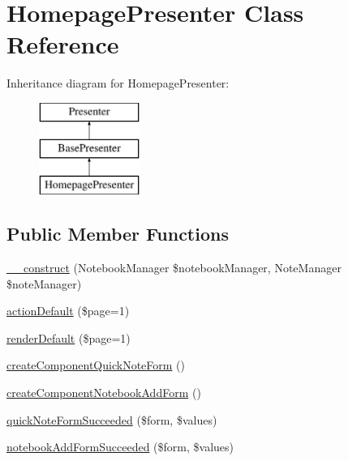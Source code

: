 \hypertarget{class_app_1_1_presenters_1_1_homepage_presenter}{}\section{Homepage\+Presenter Class Reference}
\label{class_app_1_1_presenters_1_1_homepage_presenter}
Inheritance diagram for Homepage\+Presenter\+:\begin{figure}[H]
\begin{center}
\leavevmode
\includegraphics[height=3.000000cm]{class_app_1_1_presenters_1_1_homepage_presenter}
\end{center}
\end{figure}
\subsection*{Public Member Functions}
\begin{DoxyCompactItemize}
\item 
\mbox{\hyperlink{class_app_1_1_presenters_1_1_homepage_presenter_abf10af0e00d40379ce44c79183832689}{\+\_\+\+\_\+construct}} (Notebook\+Manager \$notebook\+Manager, Note\+Manager \$note\+Manager)
\item 
\mbox{\hyperlink{class_app_1_1_presenters_1_1_homepage_presenter_a1090bf761e1e8e9243cb3062c11600db}{action\+Default}} (\$page=1)
\item 
\mbox{\hyperlink{class_app_1_1_presenters_1_1_homepage_presenter_a7824b03de268f5968857a8ea1b23abe0}{render\+Default}} (\$page=1)
\item 
\mbox{\hyperlink{class_app_1_1_presenters_1_1_homepage_presenter_a40f94e2f3bc673ae3f7190f002fef637}{create\+Component\+Quick\+Note\+Form}} ()
\item 
\mbox{\hyperlink{class_app_1_1_presenters_1_1_homepage_presenter_a6bff9f0e53d83bc12b862f35d28913b6}{create\+Component\+Notebook\+Add\+Form}} ()
\item 
\mbox{\hyperlink{class_app_1_1_presenters_1_1_homepage_presenter_ae4cce48b067df705c3a2c984fa74f3a9}{quick\+Note\+Form\+Succeeded}} (\$form, \$values)
\item 
\mbox{\hyperlink{class_app_1_1_presenters_1_1_homepage_presenter_a5579f6a3db49483e429a74ba2b638b43}{notebook\+Add\+Form\+Succeeded}} (\$form, \$values)
\end{DoxyCompactItemize}
